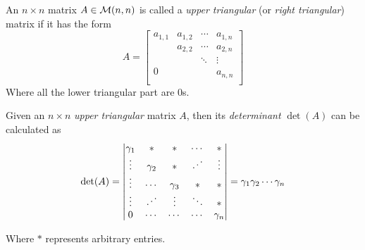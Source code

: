 \begin{definition}
    An $n \times n$ matrix $A \in \mathcal{M}(n, n)$ is called a \textit{upper triangular} (or \textit{right triangular}) matrix if it has the form
    \begin{equation}
        A = \begin{bmatrix}
            a_{1, 1} & a_{1, 2} & \cdots & a_{1, n} \\
                     & a_{2, 2} & \cdots & a_{2, n} \\
                     &          & \ddots & \vdots   \\
            0        &          &        & a_{n, n} \\
        \end{bmatrix}
    \end{equation}
    Where all the lower triangular part are $0$s.
\end{definition}

\begin{lemma}
    Given an $n \times n$ \textit{upper triangular} matrix $A$, then its \textit{determinant} $\det(A)$ can be calculated as
    \begin{equation}
        \det(A) =
        \left\vert
        \begin{matrix}
            \gamma_1 & \ast     & \ast     & \cdots  & \ast     \\
            \vdots   & \gamma_2 & \ast     & \rddots & \vdots   \\
            \vdots   & \cdots   & \gamma_3 & \ast    & \ast     \\
            \vdots   & \rddots  & \vdots   & \ddots  & \ast     \\
            0        & \cdots   & \cdots   & \cdots  & \gamma_n 
        \end{matrix}
        \right\vert
        =
        \gamma_1 \gamma_2 \cdots \gamma_n
    \end{equation}
    
    Where $\ast$ represents arbitrary entries.
\end{lemma}

